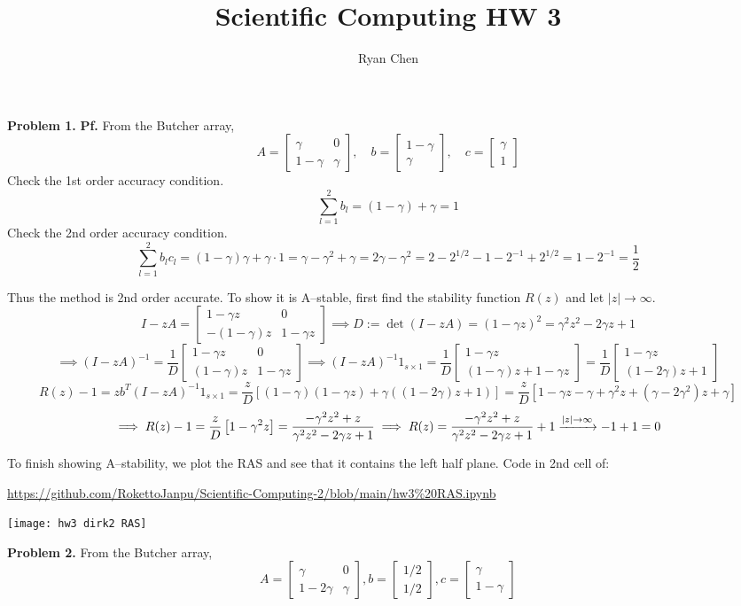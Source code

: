 \documentclass{article}
\title{Scientific Computing HW 3}
\author{Ryan Chen}
\def\tbf#1{\textbf{#1}}
\newcommand{\sbr}[1]{\left[#1\right]}
\newcommand{\m}[2][b]{\begin{#1matrix}#2\end{#1matrix}}
\newcommand{\inv}{^{-1}}
\newcommand{\pf}{\tbf{Pf. }}
\newcommand{\imp}{\implies}
\newcommand{\sep}[1][.5cm]{\vspace{#1}}
\begin{document}
\maketitle



\tbf{Problem 1.} \pf From the Butcher array,
$$A = \m{\gamma & 0 \\ 1-\gamma & \gamma},
\quad b = \m{1-\gamma \\ \gamma},
\quad c = \m{\gamma \\ 1}$$
Check the 1st order accuracy condition.
$$\sum_{l=1}^2 b_l = (1-\gamma)+\gamma = 1$$
Check the 2nd order accuracy condition.
$$\sum_{l=1}^2 b_lc_l = (1-\gamma)\gamma+\gamma\cdot 1
= \gamma-\gamma^2+\gamma
= 2\gamma-\gamma^2
= 2-2^{1/2}-1-2\inv+2^{1/2}
= 1-2\inv
= \frac12$$

Thus the method is 2nd order accurate. To show it is A--stable, first find the stability function $R(z)$ and let $|z|\to\infty$. 
$$I - zA = \m{1-\gamma z & 0 \\ -(1-\gamma)z & 1-\gamma z}
\imp D := \det(I-zA) = (1-\gamma z)^2 = \gamma^2z^2 - 2\gamma z+1$$
$$\imp (I-zA)\inv = \frac1D\m{1-\gamma z & 0 \\ (1-\gamma)z & 1-\gamma z}
\imp (I-zA)\inv 1_{s\times 1} = \frac1D\m{1-\gamma z \\ (1-\gamma)z+1-\gamma z} = \frac1D\m{1-\gamma z \\ (1-2\gamma)z+1}$$
$$R(z) - 1 = zb^T(I-zA)\inv 1_{s\times 1} = \frac zD\sbr{(1-\gamma)(1-\gamma z)+\gamma((1-2\gamma)z+1)}
= \frac zD\sbr{1-\gamma z-\gamma+\gamma^2z+(\gamma-2\gamma^2)z+\gamma}$$
$$\imp R(z) - 1 = \frac zD\sbr{1-\gamma^2z}
= \frac{-\gamma^2z^2+z}{\gamma^2z^2-2\gamma z+1}
\imp R(z) = \frac{-\gamma^2z^2+z}{\gamma^2z^2-2\gamma z+1} + 1 \app[|z|] -1+1 = 0$$

To finish showing A--stability, we plot the RAS and see that it contains the left half plane. Code in 2nd cell of:  

\url{https://github.com/RokettoJanpu/Scientific-Computing-2/blob/main/hw3%20RAS.ipynb}

\begin{center}
	\texttt{[image: hw3 dirk2 RAS]}
\end{center}
\sep



\tbf{Problem 2.} From the Butcher array,
$$A = \m{\gamma & 0 \\ 1-2\gamma & \gamma},
b = \m{1/2 \\ 1/2},
c = \m{\gamma \\ 1-\gamma}$$
\end{document}

